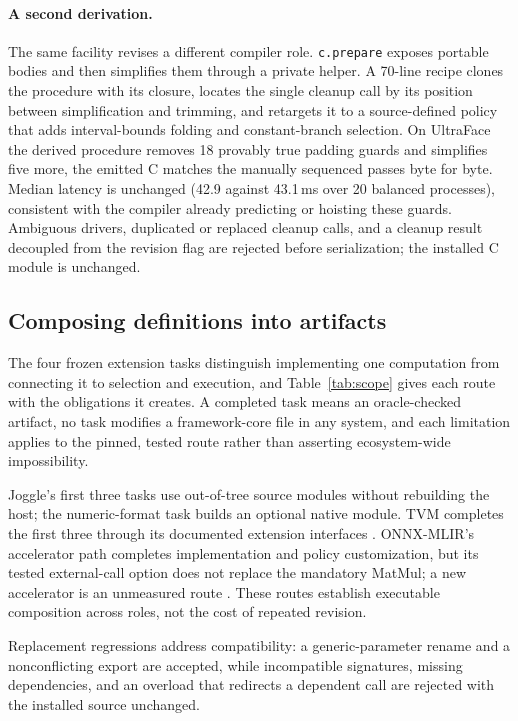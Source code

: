 \documentclass[sigplan,anonymous,review]{acmart}
\begin{document}
\paragraph{A second derivation.}
The same facility revises a different compiler role. \texttt{c.prepare}
exposes portable bodies and then simplifies them through a private helper.
A 70-line recipe clones the procedure with its closure, locates the single
cleanup call by its position between simplification and trimming, and
retargets it to a source-defined policy that adds interval-bounds folding
and constant-branch selection. On UltraFace the derived procedure removes 18
provably true padding guards and simplifies five more, the emitted C matches
the manually sequenced passes byte for byte. Median latency is unchanged (42.9 against
43.1\,ms over 20 balanced processes), consistent with the compiler already
predicting or hoisting these guards. Ambiguous drivers, duplicated or
replaced cleanup calls, and a cleanup result decoupled from the revision flag
are rejected before serialization; the installed C module is unchanged.

\subsection{Composing definitions into artifacts}
\label{sec:eval-modules}
The four frozen extension tasks distinguish implementing one computation from
connecting it to selection and execution, and Table~\ref{tab:scope} gives each
route with the obligations it creates. A completed task means an oracle-checked
artifact, no task modifies a framework-core file in any system, and each
limitation applies to the pinned, tested route rather than asserting
ecosystem-wide impossibility.

Joggle's first three tasks use out-of-tree source modules without rebuilding
the host; the numeric-format task builds an optional native module. TVM
completes the first three through its documented extension interfaces
\cite{tvmByocDocs,tvmBuildDocs}. ONNX-MLIR's accelerator path completes
implementation and policy customization, but its tested external-call option
does not replace the mandatory MatMul; a new accelerator is an unmeasured
route \cite{onnxmlirAccelDocs,onnxmlirBuildDocs}. These routes establish
executable composition across roles, not the cost of repeated revision.

Replacement regressions address compatibility: a generic-parameter rename and
a nonconflicting export are accepted, while incompatible signatures, missing
dependencies, and an overload that redirects a dependent call are rejected with
the installed source unchanged.
\end{document}
